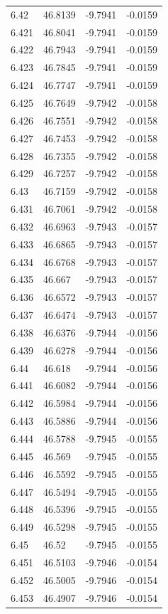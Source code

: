 \begin{tabular}{llll}
6.42 & 46.8139 & -9.7941 & -0.0159 \\
6.421 & 46.8041 & -9.7941 & -0.0159 \\
6.422 & 46.7943 & -9.7941 & -0.0159 \\
6.423 & 46.7845 & -9.7941 & -0.0159 \\
6.424 & 46.7747 & -9.7941 & -0.0159 \\
6.425 & 46.7649 & -9.7942 & -0.0158 \\
6.426 & 46.7551 & -9.7942 & -0.0158 \\
6.427 & 46.7453 & -9.7942 & -0.0158 \\
6.428 & 46.7355 & -9.7942 & -0.0158 \\
6.429 & 46.7257 & -9.7942 & -0.0158 \\
6.43 & 46.7159 & -9.7942 & -0.0158 \\
6.431 & 46.7061 & -9.7942 & -0.0158 \\
6.432 & 46.6963 & -9.7943 & -0.0157 \\
6.433 & 46.6865 & -9.7943 & -0.0157 \\
6.434 & 46.6768 & -9.7943 & -0.0157 \\
6.435 & 46.667 & -9.7943 & -0.0157 \\
6.436 & 46.6572 & -9.7943 & -0.0157 \\
6.437 & 46.6474 & -9.7943 & -0.0157 \\
6.438 & 46.6376 & -9.7944 & -0.0156 \\
6.439 & 46.6278 & -9.7944 & -0.0156 \\
6.44 & 46.618 & -9.7944 & -0.0156 \\
6.441 & 46.6082 & -9.7944 & -0.0156 \\
6.442 & 46.5984 & -9.7944 & -0.0156 \\
6.443 & 46.5886 & -9.7944 & -0.0156 \\
6.444 & 46.5788 & -9.7945 & -0.0155 \\
6.445 & 46.569 & -9.7945 & -0.0155 \\
6.446 & 46.5592 & -9.7945 & -0.0155 \\
6.447 & 46.5494 & -9.7945 & -0.0155 \\
6.448 & 46.5396 & -9.7945 & -0.0155 \\
6.449 & 46.5298 & -9.7945 & -0.0155 \\
6.45 & 46.52 & -9.7945 & -0.0155 \\
6.451 & 46.5103 & -9.7946 & -0.0154 \\
6.452 & 46.5005 & -9.7946 & -0.0154 \\
6.453 & 46.4907 & -9.7946 & -0.0154 \\

\end{tabular}
